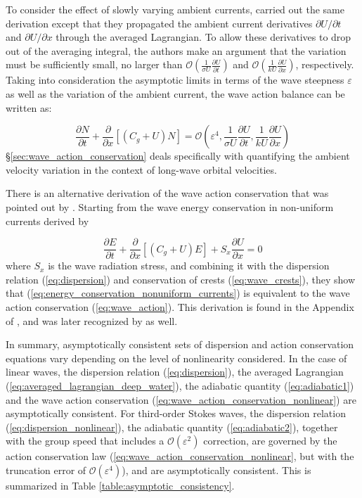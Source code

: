 \documentclass[lineno]{jfm}
\begin{document}
To consider the effect of slowly varying ambient currents,
\citet{bretherton1968wavetrains} carried out the same derivation except that
they propagated the ambient current derivatives $\partial U / \partial t$ and
$\partial U / \partial x$ through the averaged Lagrangian.
To allow these derivatives to drop out of the averaging integral, the authors
make an argument that the variation must be sufficiently small, no larger than
$\mathcal{O}(\frac{1}{\sigma U} \frac{\partial U}{\partial t})$ and
$\mathcal{O}(\frac{1}{k U} \frac{\partial U}{\partial x})$, respectively.
Taking into consideration the asymptotic limits in terms of the wave steepness
$\varepsilon$ as well as the variation of the ambient current, the wave action
balance can be written as:

\begin{equation}
  \frac{\partial N}{\partial t} +
  \frac{\partial}{\partial x} \left[ \left(C_g + U\right) N \right] =
  \mathcal{O}\left(\varepsilon^4, \frac{1}{\sigma U} \frac{\partial U}{\partial t}, \frac{1}{k U} \frac{\partial U}{\partial x}\right)
\end{equation}
\S\ref{sec:wave_action_conservation} deals specifically with quantifying the
ambient velocity variation in the context of long-wave orbital velocities.

There is an alternative derivation of the wave action conservation that was
pointed out by \citet{bretherton1968wavetrains}.
Starting from the wave energy conservation in non-uniform currents derived by
\citet{longuet1961changes}

\begin{equation}
  \frac{\partial E}{\partial t} +
  \frac{\partial}{\partial x} \left[ \left(C_g + U\right) E \right] +
  S_{x} \frac{\partial U}{\partial x} = 0
  \label{eq:energy_conservation_nonuniform_currents}
\end{equation}
where $S_x$ is the wave radiation stress, and combining it with the dispersion
relation (\ref{eq:dispersion}) and conservation of crests
(\ref{eq:wave_crests}), they show that (\ref{eq:energy_conservation_nonuniform_currents})
is equivalent to the wave action conservation (\ref{eq:wave_action}).
This derivation is found in the Appendix of \citet{bretherton1968wavetrains},
and was later recognized by \citet{whitham1974linear} as well.

In summary, asymptotically consistent sets of dispersion and action conservation
equations vary depending on the level of nonlinearity considered.
In the case of linear waves, the dispersion relation (\ref{eq:dispersion}),
the averaged Lagrangian (\ref{eq:averaged_lagrangian_deep_water}), the adiabatic
quantity (\ref{eq:adiabatic1}) and the wave action conservation
(\ref{eq:wave_action_conservation_nonlinear}) are asymptotically consistent.
For third-order Stokes waves, the dispersion relation
(\ref{eq:dispersion_nonlinear}), the adiabatic quantity (\ref{eq:adiabatic2}),
together with the group speed that includes a $\mathcal{O}(\varepsilon^2)$ correction,
are governed by the action conservation law
(\ref{eq:wave_action_conservation_nonlinear}, but with the truncation error of
$\mathcal{O}(\varepsilon^4)$), and are asymptotically consistent.
This is summarized in Table \ref{table:asymptotic_consistency}.
\end{document}
